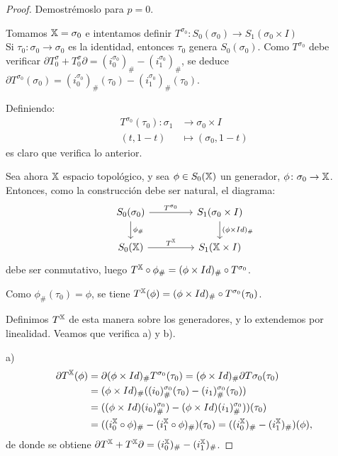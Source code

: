 \begin{proof}
  Demostrémoslo para $p = 0$.

  Tomamos ${\mathbb X} = \sigma_0$ e intentamos definir $T^{\sigma_0} \colon S_0(\sigma_0) \to S_1(\sigma_0 \times I)$ \\
  Si $\tau_0 \colon \sigma_0 \to \sigma_0$ es la identidad, entonces $\tau_0$ genera $S_0(\sigma_0)$. Como $T^{\sigma_0}$
  debe verificar $\partial T^\sigma_0 + T^\sigma_0 \partial = (i_0^{\sigma_0})_\# - (i_1^{\sigma_0})_\#$, se deduce
  $\partial T^{\sigma_0}(\sigma_0) = (i_0^{\sigma_0})_\# (\tau_0) - (i_1^{\sigma_0})_\# (\tau_0)$.

  Definiendo:
  \begin{align*}
    T^{\sigma_0}(\tau_0) \colon \sigma_1 &\to \sigma_0 \times I \\
                       (t, 1-t) &\mapsto (\sigma_0, 1-t)
  \end{align*}
  es claro que verifica lo anterior.

  Sea ahora ${\mathbb X}$ espacio topológico, y sea $\phi \in S_0({\mathbb X})$ un generador, $\phi \colon \sigma_0 \to {\mathbb X}$.
  Entonces, como la construcción debe ser natural, el diagrama:
  \[
  \begin{tikzcd}
    S_0(\sigma_0) \arrow{r}{T^{\sigma_0}} \arrow{d}{\phi_\#} & [2em] S_1(\sigma_0 \times I) \arrow{d}{(\phi \times Id)_\#} \\
    \SX{0} \arrow{r}{T^\X}                 & S_1(\X \times I)
  \end{tikzcd}
  \]
  debe ser conmutativo, luego $T^{\mathbb X} \circ \phi_\# = (\phi \times Id)_\# \circ T^{\sigma_0}$.

  Como $\phi_\#(\tau_0) = \phi$, se tiene $T^{\mathbb X}(\phi) = (\phi \times Id)_\# \circ T^{\sigma_0}(\tau_0)$.

  Definimos $T^{\mathbb X}$ de esta manera sobre los generadores, y lo extendemos por linealidad. Veamos que verifica a) y b).

  a)
  \begin{align*}
    \partial T^{\mathbb X}(\phi) &= \partial(\phi \times Id)_\# T^{\sigma_0}(\tau_0) = (\phi \times Id)_\# \partial T{ \sigma_0}(\tau_0) \\
                        &= (\phi \times Id)_\# ((i_0)_\#^{\sigma_0}(\tau_0) - (i_1)_\#^{\sigma_0}(\tau_0)) \\
                        &= ((\phi \times Id) (i_0)_\#^{\sigma_0}) - (\phi \times Id) (i_1)_\#^{\sigma_0}))(\tau_0) \\
                        &= ((i_0^{\mathbb X} \circ \phi)_\# - (i_1^{\mathbb X} \circ \phi)_\#) (\tau_0) = ((i_0^{\mathbb X})_\# - (i_1^{\mathbb X})_\#)(\phi),
  \end{align*}
  de donde se obtiene $\partial T^{\mathbb X} + T^{\mathbb X} \partial = (i_0^{\mathbb X})_\# - (i_1^{\mathbb X})_\#$.


\end{proof}
